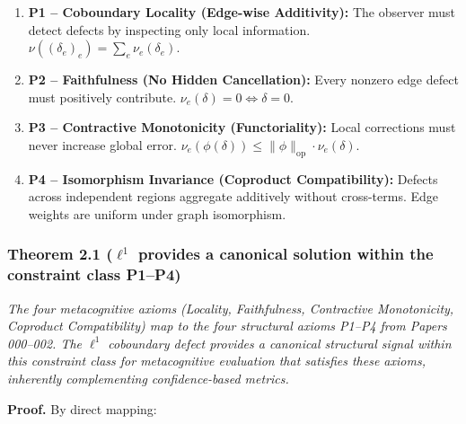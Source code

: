 \documentclass[
]{article}
\providecommand{\tightlist}{%
  \setlength{\itemsep}{0pt}\setlength{\parskip}{0pt}}
\begin{document}
\begin{enumerate}
\def\labelenumi{\arabic{enumi}.}
\tightlist
\item
  \textbf{P1 -- Coboundary Locality (Edge-wise Additivity):} The
  observer must detect defects by inspecting only local information.
  \(\nu((\delta_e)_e) = \sum_e \nu_e(\delta_e)\).
\item
  \textbf{P2 -- Faithfulness (No Hidden Cancellation):} Every nonzero
  edge defect must positively contribute.
  \(\nu_e(\delta) = 0 \iff \delta = 0\).
\item
  \textbf{P3 -- Contractive Monotonicity (Functoriality):} Local
  corrections must never increase global error.
  \(\nu_e(\phi(\delta)) \leq \|\phi\|_{\mathrm{op}} \cdot \nu_e(\delta)\).
\item
  \textbf{P4 -- Isomorphism Invariance (Coproduct Compatibility):}
  Defects across independent regions aggregate additively without
  cross-terms. Edge weights are uniform under graph isomorphism.
\end{enumerate}

\subsubsection{\texorpdfstring{Theorem 2.1 (\(\ell^1\) provides a
canonical solution within the constraint class
P1--P4)}{Theorem 2.1 (\textbackslash ell\^{}1 provides a canonical solution within the constraint class P1--P4)}}\label{theorem-2.1-ell1-provides-a-canonical-solution-within-the-constraint-class-p1p4}

\emph{The four metacognitive axioms (Locality, Faithfulness, Contractive
Monotonicity, Coproduct Compatibility) map to the four structural axioms
P1--P4 from Papers 000--002. The \(\ell^1\) coboundary defect provides a
canonical structural signal within this constraint class for
metacognitive evaluation that satisfies these axioms, inherently
complementing confidence-based metrics.}

\textbf{Proof.} By direct mapping:
\end{document}
